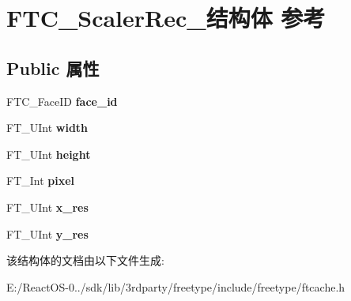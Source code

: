 \hypertarget{struct_f_t_c___scaler_rec__}{}\section{F\+T\+C\+\_\+\+Scaler\+Rec\+\_\+结构体 参考}
\label{struct_f_t_c___scaler_rec__}
\subsection*{Public 属性}
\begin{DoxyCompactItemize}
\item 
\mbox{\label{struct_f_t_c___scaler_rec___a8e963aa619409e646558fe7aa272e81f}} 
F\+T\+C\+\_\+\+Face\+ID {\bfseries face\+\_\+id}
\item 
\mbox{\label{struct_f_t_c___scaler_rec___a11e13d907ca4661bf7c1d98fffecf321}} 
F\+T\+\_\+\+U\+Int {\bfseries width}
\item 
\mbox{\label{struct_f_t_c___scaler_rec___a9b3a9b4d7148bbaa4daaae1e1fbb2dbc}} 
F\+T\+\_\+\+U\+Int {\bfseries height}
\item 
\mbox{\label{struct_f_t_c___scaler_rec___ab78868341e2d66f17e6f1d77e9e054d2}} 
F\+T\+\_\+\+Int {\bfseries pixel}
\item 
\mbox{\label{struct_f_t_c___scaler_rec___a886c7c1230dc5d5e6b3fc32d06274752}} 
F\+T\+\_\+\+U\+Int {\bfseries x\+\_\+res}
\item 
\mbox{\label{struct_f_t_c___scaler_rec___accb53c7a9aeebb41c05f48d14d3dfe71}} 
F\+T\+\_\+\+U\+Int {\bfseries y\+\_\+res}
\end{DoxyCompactItemize}


该结构体的文档由以下文件生成\+:\begin{DoxyCompactItemize}
\item 
E\+:/\+React\+O\+S-\/0../sdk/lib/3rdparty/freetype/include/freetype/ftcache.\+h\end{DoxyCompactItemize}
